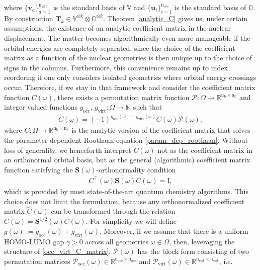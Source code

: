 \documentclass[reqno]{amsart}
\begin{document}
where $\lbrace \mathbf{v}_{a}\rbrace_{a=1}^{\text{n}_\text{virt}}$ is the standard basis of $\mathbb{V}$ and $\lbrace \mathbf{u}_{i}\rbrace_{i=1}^{\text{n}_\text{occ}}$ is the standard basis of $\mathbb{O}$. By construction $\mathbf{T}_k\in \mathbb{V}^{\otimes k}\otimes \mathbb{O}^{\otimes k}$. Theorem \ref{analytic_C} gives us, under certain assumptions, the existence of an analytic coefficient matrix in the nuclear displacement. The matter becomes algorithmically even more manageable if the orbital energies are completely separated, since the choice of the coefficient matrix as a function of the nuclear geometries is then unique up to the choice of signs in the columns. Furthermore, this convenience remains up to index reordering if one only considers isolated geometries where orbital energy crossings occur. Therefore, if we stay in that framework and consider the coefficient matrix function $C(\omega)$, there exists a permutation matrix function $\mathscr{P}:\Omega\longrightarrow \mathbb{R}^{\text{n}_\text{b}\times \text{n}_\text{b}}$ and integer valued functions $g_{\text{occ}},\, g_{\text{virt}}:\Omega \longrightarrow \mathbb{N}$ such that
\begin{align}\label{analytic_coeff_matrix_total}
    C(\omega)=(-1)^{g_{\text{occ}}(\omega)+g_{\text{virt}}(\omega)}\overline{C}(\omega)\mathscr{P}(\omega),
\end{align}
where $\overline{C}: \Omega\longrightarrow \mathbb{R}^{\text{n}_\text{b}\times \text{n}_\text{b}}$ is the analytic version of the coefficient matrix that solves the parameter dependent Roothaan equation \eqref{param_dep_roothaan}. Without loss of generality, we henceforth interpret $C(\omega)$ not as the coefficient matrix in an orthonormal orbital basis, but as the general (algorithmic) coefficient matrix function satisfying the $\mathbf{S}(\omega)$-orthonormality condition 
\begin{align}
    C^\top(\omega)\mathbf{S}(\omega)C(\omega)=\mathrm{I},
\end{align}
which is provided by most state-of-the-art quantum chemistry algorithms.
This choice does not limit the formulation, because any orthonormalized coefficient matrix $\tilde{C}(\omega)$ can be transformed through the relation $\tilde{C}(\omega)=\mathbf{S}^{1/2}(\omega)C(\omega)$.
For simplicity we will define $g(\omega):=g_{\text{occ}}(\omega)+g_{\text{virt}}(\omega)$. Moreover, if we assume that there is a uniform HOMO-LUMO gap $\gamma>0$ across all geometries $\omega\in \Omega$, then, leveraging the structure of \eqref{occ_virt_C_matrix},  $\mathscr{P}(\omega)$ has the block form consisting of two permutation matrices $\mathscr{P}_{\text{occ}}(\omega)\in \mathbb{R}^{\text{n}_\text{occ}\times \text{n}_\text{occ} }$ and $\mathscr{P}_{\text{virt}}(\omega)\in \mathbb{R}^{\text{n}_\text{virt}\times \text{n}_\text{virt} }$, i.e. 
\end{document}
